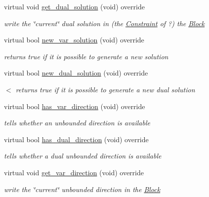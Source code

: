 \begin{Indent}
\begin{DoxyCompactItemize}
virtual void \mbox{\hyperlink{class_s_m_spp__di__unipi__it_1_1_m_c_f_solver_a7ceb04914b5dcbb1cfd8f0e844b56014}{get\+\_\+dual\+\_\+solution}} (void) override
\begin{DoxyCompactList}\small\item\em write the \char`\"{}current\char`\"{} dual solution in (the \mbox{\hyperlink{class_s_m_spp__di__unipi__it_1_1_constraint}{Constraint}} of ?) the \mbox{\hyperlink{class_s_m_spp__di__unipi__it_1_1_block}{Block}} \end{DoxyCompactList}\item 
virtual bool \mbox{\hyperlink{class_s_m_spp__di__unipi__it_1_1_m_c_f_solver_a62678dc9f7485d5a2992c588c5dc7d49}{new\+\_\+var\+\_\+solution}} (void) override
\begin{DoxyCompactList}\small\item\em returns true if it is possible to generate a new solution \end{DoxyCompactList}\item 
virtual bool \mbox{\hyperlink{class_s_m_spp__di__unipi__it_1_1_m_c_f_solver_aa78ff49c515c8c6e2da6216d104dc219}{new\+\_\+dual\+\_\+solution}} (void) override
\begin{DoxyCompactList}\small\item\em $<$ returns true if it is possible to generate a new dual solution \end{DoxyCompactList}\item 
virtual bool \mbox{\hyperlink{class_s_m_spp__di__unipi__it_1_1_m_c_f_solver_a4f0fecd26f7731710ff6af22fa0cc635}{has\+\_\+var\+\_\+direction}} (void) override
\begin{DoxyCompactList}\small\item\em tells whether an unbounded direction is available \end{DoxyCompactList}\item 
virtual bool \mbox{\hyperlink{class_s_m_spp__di__unipi__it_1_1_m_c_f_solver_a3a262f8106b76603f0828e41bbe5b022}{has\+\_\+dual\+\_\+direction}} (void) override
\begin{DoxyCompactList}\small\item\em tells whether a dual unbounded direction is available \end{DoxyCompactList}\item 
virtual void \mbox{\hyperlink{class_s_m_spp__di__unipi__it_1_1_m_c_f_solver_af6cbccb8671398cc84c4e0a730a03285}{get\+\_\+var\+\_\+direction}} (void) override
\begin{DoxyCompactList}\small\item\em write the \char`\"{}current\char`\"{} unbounded direction in the \mbox{\hyperlink{class_s_m_spp__di__unipi__it_1_1_block}{Block}} \end{DoxyCompactList}\item 

\end{DoxyCompactItemize}
\end{Indent}
